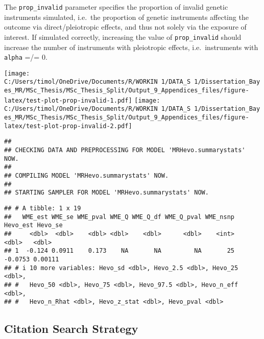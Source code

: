 \documentclass[
]{article}
\begin{document}
The \texttt{prop\_invalid} parameter specifies the proportion of invalid
genetic instruments simulated, i.e.~the proportion of genetic
instruments affecting the outcome via direct/pleiotropic effects, and
thus not solely via the exposure of interest. If simulated correctly,
increasing the value of \texttt{prop\_invalid} should increase the
number of instruments with pleiotropic effects, i.e.~instruments with
\texttt{alpha} =/= 0.

\texttt{[image: C:/Users/timol/OneDrive/Documents/R/WORKIN~1/DATA\_S~1/Dissertation\_Bayes\_MR/MSc\_Thesis/MSc\_Thesis\_Split/Output\_9\_Appendices\_files/figure-latex/test-plot-prop-invalid-1.pdf]}
\texttt{[image: C:/Users/timol/OneDrive/Documents/R/WORKIN~1/DATA\_S~1/Dissertation\_Bayes\_MR/MSc\_Thesis/MSc\_Thesis\_Split/Output\_9\_Appendices\_files/figure-latex/test-plot-prop-invalid-2.pdf]}

\begin{verbatim}
## 
## CHECKING DATA AND PREPROCESSING FOR MODEL 'MRHevo.summarystats' NOW.
## 
## COMPILING MODEL 'MRHevo.summarystats' NOW.
## 
## STARTING SAMPLER FOR MODEL 'MRHevo.summarystats' NOW.
\end{verbatim}

\begin{verbatim}
## # A tibble: 1 x 19
##   WME_est WME_se WME_pval WME_Q WME_Q_df WME_Q_pval WME_nsnp Hevo_est Hevo_se
##     <dbl>  <dbl>    <dbl> <dbl>    <dbl>      <dbl>    <int>    <dbl>   <dbl>
## 1  -0.124 0.0911    0.173    NA       NA         NA       25  -0.0753 0.00111
## # i 10 more variables: Hevo_sd <dbl>, Hevo_2.5 <dbl>, Hevo_25 <dbl>,
## #   Hevo_50 <dbl>, Hevo_75 <dbl>, Hevo_97.5 <dbl>, Hevo_n_eff <dbl>,
## #   Hevo_n_Rhat <dbl>, Hevo_z_stat <dbl>, Hevo_pval <dbl>
\end{verbatim}

\subsection{Citation Search Strategy}\label{citation-search-strategy}
\end{document}
